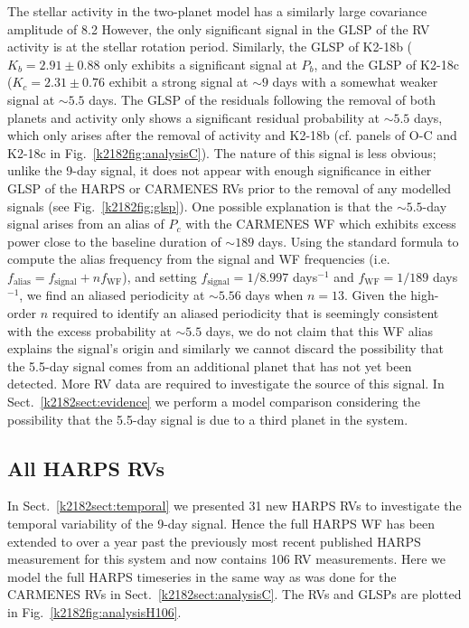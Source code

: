 The stellar activity in the two-planet model has a similarly large covariance amplitude of 8.2 
However, the only significant signal in the GLSP of the RV activity is at the stellar rotation period.
Similarly, the GLSP of K2-18b ($K_b=2.91\pm 0.88$ \mps{)}
only exhibits a significant signal at $P_b$, and the GLSP of K2-18c ($K_c=2.31\pm 0.76$ \mps{)} exhibit
a strong signal at $\sim 9$ days with a somewhat weaker signal at $\sim 5.5$ days. The GLSP of the
residuals following the removal of both planets and activity only shows a significant residual probability at
$\sim 5.5$ days, which only arises after the removal of activity and K2-18b (cf. panels of O-C and K2-18c in
Fig.~\ref{k2182fig:analysisC}). The nature of this signal is less obvious; unlike the 9-day signal, it does
not appear with enough significance in either GLSP of the HARPS or CARMENES RVs prior to the removal of any
modelled signals (see Fig.~\ref{k2182fig:glsp}). One possible explanation is that the $\sim 5.5$-day
signal arises from an alias of $P_c$ with the CARMENES WF which exhibits excess power close to the baseline
duration of $\sim 189$ days. Using the standard formula to compute the alias frequency from the signal and WF
frequencies (i.e. $f_{\text{alias}} = f_{\text{signal}} + n f_{\text{WF}}$),
and setting $f_{\text{signal}}=1/8.997$ days$^{-1}$ and
$f_{\text{WF}}=1/189$ days$^{-1}$, we find an aliased periodicity at $\sim 5.56$ days when $n=13$.
Given the high-order $n$ required to identify an aliased periodicity that is seemingly consistent with the excess
probability at $\sim 5.5$ days, we do not claim that this WF alias explains the signal's origin and similarly
we cannot discard the possibility that the 5.5-day  signal comes from an additional planet that has not yet been
detected. More RV data are required to investigate the source of this signal. In Sect.~\ref{k2182sect:evidence}
we  perform a model comparison considering the possibility that the 5.5-day signal is due to a third planet
in the system.

\subsection{All HARPS RVs} \label{k2182sect:newrvs}
In Sect.~\ref{k2182sect:temporal} we presented 31 new HARPS RVs to investigate the temporal variability of the
9-day signal. Hence the full HARPS WF has been extended to over a year past the previously most recent
published HARPS measurement for this system  and now contains 106 RV measurements.
Here we model the full HARPS timeseries in the same way  as was done for the CARMENES RVs in
Sect.~\ref{k2182sect:analysisC}. The RVs and GLSPs are plotted in Fig.~\ref{k2182fig:analysisH106}. \\

